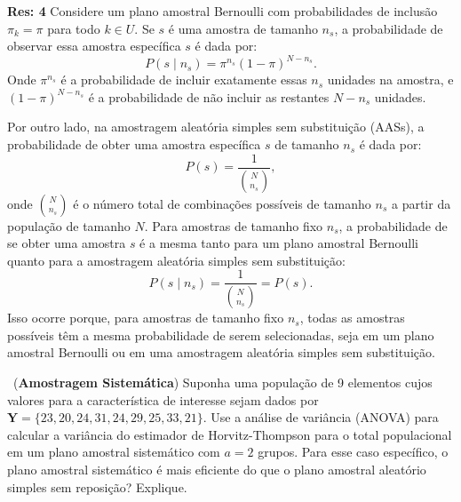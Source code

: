\documentclass[a4paper,12pt,oneside,twocolumn]{Config/milktest}
\begin{document}
\medskip
{\scriptsize  {\bf Res: 4}
Considere um plano amostral Bernoulli com probabilidades de inclusão \( \pi_k = \pi \) para todo \( k \in U \). Se \( s \) é uma amostra de tamanho \( n_s \), a probabilidade de observar essa amostra específica \( s \) é dada por: 
\[
P(s \mid n_s) = \pi^{n_s} (1 - \pi)^{N - n_s}.
\] Onde \( \pi^{n_s} \) é a probabilidade de incluir exatamente essas \( n_s \) unidades na amostra, e \( (1 - \pi)^{N - n_s} \) é a probabilidade de não incluir as restantes \( N - n_s \) unidades.

Por outro lado, na amostragem aleatória simples sem substituição (AASs), a probabilidade de obter uma amostra específica \( s \) de tamanho \( n_s \) é dada por:
\[
P(s) = \frac{1}{\binom{N}{n_s}},
\] 
onde \( \binom{N}{n_s} \) é o número total de combinações possíveis de tamanho \( n_s \) a partir da população de tamanho \( N \). 
Para amostras de tamanho fixo \( n_s \), a probabilidade de se obter uma amostra \( s \) é a mesma tanto para um plano amostral Bernoulli quanto para a amostragem aleatória simples sem substituição: 
\[
P(s \mid n_s) = \frac{1}{\binom{N}{n_s}} = P(s).
\] Isso ocorre porque, para amostras de tamanho fixo \( n_s \), todas as amostras possíveis têm a mesma probabilidade de serem selecionadas, seja em um plano amostral Bernoulli ou em uma amostragem aleatória simples sem substituição.
}


\medskip
\question~({\bf Amostragem Sistemática}) Suponha uma população de 9 elementos cujos valores para a característica de interesse sejam dados por
$\mathbf{Y} = \{23, 20, 24, 31, 24, 29, 25, 33, 21\}.$ Use a análise de variância (ANOVA) para calcular a variância do estimador de Horvitz-Thompson para o total populacional em um plano amostral sistemático com $a = 2$ grupos. Para esse caso específico, o plano amostral sistemático é mais eficiente do que o plano amostral aleatório simples sem reposição? Explique.
\end{document}
